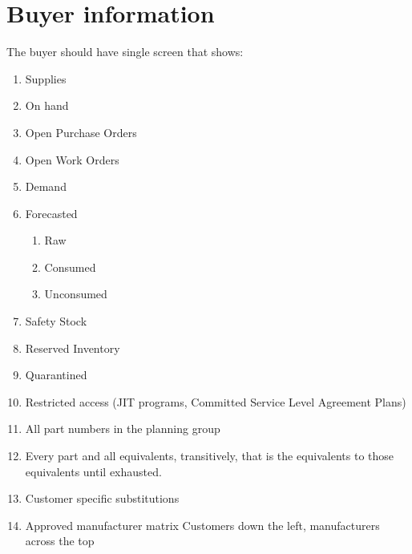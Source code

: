 \documentclass[letterpaper,10pt,english]{sphinxmanual}
\begin{document}
\section{Buyer information}
\label{\detokenize{BusinessProcessReengineering:buyer-information}}
The buyer should have single screen that shows:
\begin{enumerate}
%
\item {} 
Supplies

\item {} 
On hand

\item {} 
Open Purchase Orders

\item {} 
Open Work Orders

\item {} 
Demand

\item {} 
Forecasted
\begin{enumerate}
%
\item {} 
Raw

\item {} 
Consumed

\item {} 
Unconsumed

\end{enumerate}

\item {} 
Safety Stock

\item {} 
Reserved Inventory

\item {} 
Quarantined

\item {} 
Restricted access (JIT programs, Committed Service Level Agreement
Plans)

\item {} 
All part numbers in the planning group

\item {} 
Every part and all equivalents, transitively, that is the equivalents
to those equivalents until exhausted.

\item {} 
Customer specific substitutions

\item {} 
Approved manufacturer matrix Customers down the left, manufacturers
across the top


\end{enumerate}
\end{document}
